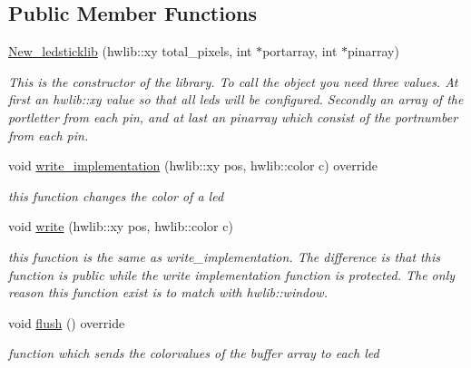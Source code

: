 \subsection*{Public Member Functions}
\begin{DoxyCompactItemize}
\item 
\mbox{\label{class_new__ledsticklib_aee26882703a2518c04a6cf9e22ca2d39}} 
\mbox{\hyperlink{class_new__ledsticklib_aee26882703a2518c04a6cf9e22ca2d39}{New\+\_\+ledsticklib}} (hwlib\+::xy total\+\_\+pixels, int $\ast$portarray, int $\ast$pinarray)
\begin{DoxyCompactList}\small\item\em This is the constructor of the library. To call the object you need three values. At first an hwlib\+::xy value so that all leds will be configured. Secondly an array of the portletter from each pin, and at last an pinarray which consist of the portnumber from each pin. \end{DoxyCompactList}\item 
void \mbox{\hyperlink{class_new__ledsticklib_a44435a90bf7bdc3bec6c4614da9c089b}{write\+\_\+implementation}} (hwlib\+::xy pos, hwlib\+::color c) override
\begin{DoxyCompactList}\small\item\em this function changes the color of a led \end{DoxyCompactList}\item 
void \mbox{\hyperlink{class_new__ledsticklib_a63b7399b72c8b72a5b541f0ac66b1f42}{write}} (hwlib\+::xy pos, hwlib\+::color c)
\begin{DoxyCompactList}\small\item\em this function is the same as write\+\_\+implementation. The difference is that this function is public while the write implementation function is protected. The only reason this function exist is to match with hwlib\+::window. \end{DoxyCompactList}\item 
\mbox{\label{class_new__ledsticklib_a25355b84916b1fff4721d76cf75b892f}} 
void \mbox{\hyperlink{class_new__ledsticklib_a25355b84916b1fff4721d76cf75b892f}{flush}} () override
\begin{DoxyCompactList}\small\item\em function which sends the colorvalues of the buffer array to each led \end{DoxyCompactList}\item 

\end{DoxyCompactItemize}
